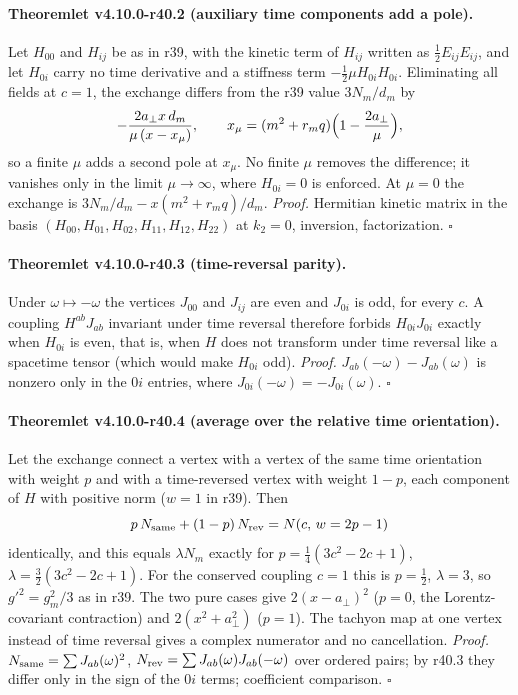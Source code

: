 \paragraph{Theoremlet v4.10.0-r40.2 (auxiliary time components add a pole).}
Let \(H_{00}\) and \(H_{ij}\) be as in r39, with the kinetic term of \(H_{ij}\) written as \(\tfrac12E_{ij}E_{ij}\), and let \(H_{0i}\) carry no time derivative
and a stiffness term \(-\tfrac12\mu H_{0i}H_{0i}\).  Eliminating all fields at \(c=1\), the exchange differs from the r39 value \(3N_m/d_m\) by
\[
 -\frac{2a_\perp x\,d_m}{\mu\,(x-x_\mu)},\qquad x_\mu=(m^2+r_mq)\Bigl(1-\frac{2a_\perp}{\mu}\Bigr),
\]
so a finite \(\mu\) adds a second pole at \(x_\mu\).  No finite \(\mu\) removes the difference; it vanishes only in the limit \(\mu\to\infty\), where \(H_{0i}=0\)
is enforced.  At \(\mu=0\) the exchange is \(3N_m/d_m-x(m^2+r_mq)/d_m\).
\emph{Proof.} Hermitian kinetic matrix in the basis \((H_{00},H_{01},H_{02},H_{11},H_{12},H_{22})\) at \(k_2=0\), inversion, factorization.  \(\square\)

\paragraph{Theoremlet v4.10.0-r40.3 (time-reversal parity).}
Under \(\omega\mapsto-\omega\) the vertices \(J_{00}\) and \(J_{ij}\) are even and \(J_{0i}\) is odd, for every \(c\).  A coupling \(H^{ab}J_{ab}\) invariant under time
reversal therefore forbids \(H_{0i}J_{0i}\) exactly when \(H_{0i}\) is even, that is, when \(H\) does not transform under time reversal like a spacetime
tensor (which would make \(H_{0i}\) odd).
\emph{Proof.} \(J_{ab}(-\omega)-J_{ab}(\omega)\) is nonzero only in the \(0i\) entries, where \(J_{0i}(-\omega)=-J_{0i}(\omega)\).  \(\square\)

\paragraph{Theoremlet v4.10.0-r40.4 (average over the relative time orientation).}
Let the exchange connect a vertex with a vertex of the same time orientation with weight \(p\) and with a time-reversed vertex with weight \(1-p\),
each component of \(H\) with positive norm (\(w=1\) in r39).  Then
\[
 p\,N_{\rm same}+(1-p)\,N_{\rm rev}=N(c,\,w=2p-1)
\]
identically, and this equals \(\lambda N_m\) exactly for \(p=\tfrac14(3c^2-2c+1)\), \(\lambda=\tfrac32(3c^2-2c+1)\).  For the conserved coupling \(c=1\) this is
\(p=\tfrac12\), \(\lambda=3\), so \(g'^2=g_m^2/3\) as in r39.  The two pure cases give \(2(x-a_\perp)^2\) (\(p=0\), the Lorentz-covariant contraction) and
\(2(x^2+a_\perp^2)\) (\(p=1\)).  The tachyon map at one vertex instead of time reversal gives a complex numerator and no cancellation.
\emph{Proof.} \(N_{\rm same}=\sum J_{ab}(\omega)^2\), \(N_{\rm rev}=\sum J_{ab}(\omega)J_{ab}(-\omega)\) over ordered pairs; by r40.3 they differ only in the sign of the
\(0i\) terms; coefficient comparison.  \(\square\)

